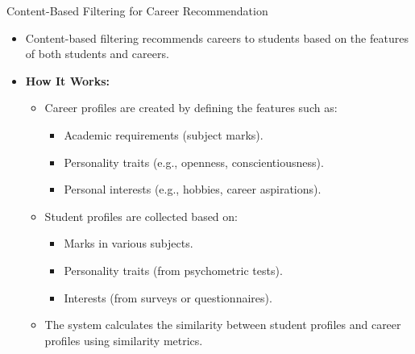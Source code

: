 \documentclass{beamer}
\begin{document}
\begin{frame}{Content-Based Filtering for Career Recommendation}
    \begin{itemize}
        \item Content-based filtering recommends careers to students based on the features of both students and careers.
        \item \textbf{How It Works:}
        \begin{itemize}
            \item Career profiles are created by defining the features such as:
            \begin{itemize}
                \item Academic requirements (subject marks).
                \item Personality traits (e.g., openness, conscientiousness).
                \item Personal interests (e.g., hobbies, career aspirations).
            \end{itemize}
            \item Student profiles are collected based on:
            \begin{itemize}
                \item Marks in various subjects.
                \item Personality traits (from psychometric tests).
                \item Interests (from surveys or questionnaires).
            \end{itemize}
            \item The system calculates the similarity between student profiles and career profiles using similarity metrics.
        \end{itemize}
    \end{itemize}
\end{frame}
\end{document}
